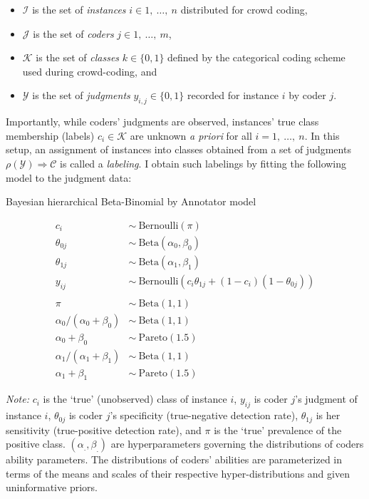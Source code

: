 \documentclass[12pt,]{article}
\providecommand{\tightlist}{%
\setlength{\itemsep}{0pt}\setlength{\parskip}{0pt}}
\begin{document}
\begin{itemize}
\tightlist
\item
  \(\mathcal{I}\) is the set of \emph{instances}
  \(i \in 1,\ \ldots ,\ n\) distributed for crowd coding,
\item
  \(\mathcal{J}\) is the set of \emph{coders} \(j \in 1,\ \ldots ,\ m\),
\item
  \(\mathcal{K}\) is the set of \emph{classes} \(k \in \{0, 1\}\)
  defined by the categorical coding scheme used during crowd-coding, and
\item
  \(\mathcal{Y}\) is the set of \emph{judgments}
  \(y_{i,j} \in \{0, 1\}\) recorded for instance \(i\) by coder \(j\).
\end{itemize}

Importantly, while coders' judgments are observed, instances' true class
membership (labels) \(c_i \in \mathcal{K}\) are unknown \emph{a priori}
for all \(i = 1,\ \ldots,\ n\). In this setup, an assignment of
instances into classes obtained from a set of judgments
\(\rho(\mathcal{Y}) \Rightarrow \mathcal{C}\) is called a
\emph{labeling}. I obtain such labelings by fitting the following model
to the judgment data:

\begin{model}
\caption{Bayesian hierarchical Beta-Binomial by Annotator model}
\label{model:bba}
    \begin{align*}
      c_i &\sim\ \mbox{Bernoulli}(\pi)\\
      \theta_{0j} &\sim\ \mbox{Beta}(\alpha_0 , \beta_0)\\
      \theta_{1j} &\sim\ \mbox{Beta}(\alpha_1 , \beta_1)\\
      y_{ij} &\sim\ \mbox{Bernoulli}(c_i\theta_{1j} + (1 - c_i)(1  - \theta_{0j}))\\
      {}&{}\\
      \pi &\sim\ \mbox{Beta}(1,1)\\
      \alpha_0/(\alpha_0 + \beta_0) &\sim\ \mbox{Beta}(1,1)\\  
      \alpha_0+\beta_0 &\sim\ \mbox{Pareto}(1.5)\\
      \alpha_1/(\alpha_1 + \beta_1) &\sim\ \mbox{Beta}(1,1)\\ 
      \alpha_1+\beta_1  &\sim\ \mbox{Pareto}(1.5)
    \end{align*}
    \hspace*{.05\linewidth}%
    \parbox[c]{.9\linewidth}{%
        \footnotesize%
        \emph{Note:} 
        $c_i$ is the `true' (unobserved) class of instance $i$, 
        $y_{ij}$ is coder $j$'s judgment of instance $i$,  
        $\theta_{0j}$ is coder $j$'s specificity (true-negative detection rate),  $\theta_{1j}$ is her sensitivity (true-positive detection rate), and
        $\pi$ is the `true' prevalence of the positive class.
        $(\alpha_., \beta_.)$ are hyperparameters governing the distributions of coders ability parameters. 
        The distributions of coders' abilities are parameterized in terms of the means and scales of their respective hyper-distributions and given uninformative priors.
    }
\end{model}
\end{document}
